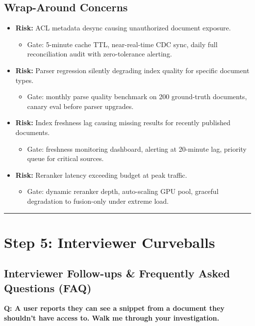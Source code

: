\subsection*{Wrap-Around Concerns}

\begin{itemize}
  \item \textbf{Risk:} ACL metadata desync causing unauthorized document exposure.
  \begin{itemize}
    \item Gate: 5-minute cache TTL, near-real-time CDC sync, daily full reconciliation audit with zero-tolerance alerting.
  \end{itemize}
  \item \textbf{Risk:} Parser regression silently degrading index quality for specific document types.
  \begin{itemize}
    \item Gate: monthly parse quality benchmark on 200 ground-truth documents, canary eval before parser upgrades.
  \end{itemize}
  \item \textbf{Risk:} Index freshness lag causing missing results for recently published documents.
  \begin{itemize}
    \item Gate: freshness monitoring dashboard, alerting at 20-minute lag, priority queue for critical sources.
  \end{itemize}
  \item \textbf{Risk:} Reranker latency exceeding budget at peak traffic.
  \begin{itemize}
    \item Gate: dynamic reranker depth, auto-scaling GPU pool, graceful degradation to fusion-only under extreme load.
  \end{itemize}
\end{itemize}

\bigskip\hrule\bigskip

\section*{Step 5: Interviewer Curveballs}

\subsection*{Interviewer Follow-ups \& Frequently Asked Questions (FAQ)}

\textbf{Q: A user reports they can see a snippet from a document they shouldn't have access to. Walk me through your investigation.}

